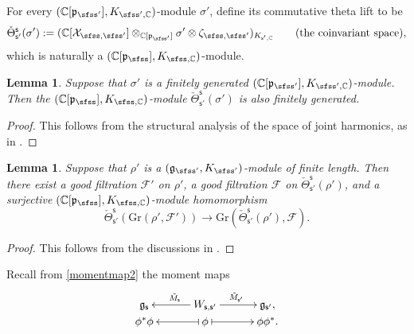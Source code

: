 \documentclass[11pt,a4paper]{amsart}
\newcommand{\CF}{{\mathcal {F}}}
\newcommand{\CX}{{\mathcal {X}}}
\newcommand{\g}{\mathfrak g}
\newcommand{\p}{\mathfrak p}
\numberwithin{equation}{section}
\newtheorem{lem}[thm]{Lemma}
\theoremstyle{remark}
\begin{document}
For every  $(\C[\p_{\sfss'}], K_{\sfss', \C})$-module $\sigma'$, define its commutative theta lift to be
\[
   \check \Theta_{\mathsf s'}^{\mathsf s}(\sigma'):=(\C[\CX_{\sfss, \sfss'}]\otimes_{\C[\p_{\sfss'}]} \sigma'\otimes \zeta_{\sfss, \sfss'})_{K_{\mathsf s', \C}} \qquad (\textrm{the  coinvariant space}),
\]
which is naturally a  $(\C[\p_{\sfss}], K_{\sfss, \C})$-module.

\begin{lem}
Suppose that $\sigma'$ is a finitely generated  $(\C[\p_{\sfss'}], K_{\sfss', \C})$-module. Then the  $(\C[\p_{\sfss}], K_{\sfss, \C})$-module   $\check \Theta_{\mathsf s'}^{\mathsf s}(\sigma')$ is also finitely generated.
\end{lem}
\begin{proof} This follows from the structural analysis of the space of joint harmonics, as in \cite[Section 4]{Howe89}.
\end{proof}

\begin{lem}\label{lm}
Suppose that $\rho'$ is a  $(\g_{\sfss'}, K_{\sfss'})$-module of finite length. Then there exist a good filtration $\CF'$ on $\rho'$, a good filtration $\CF$ on $\check \Theta_{\mathsf s'}^{\mathsf s}(\rho')$, and a surjective $(\C[\p_{\sfss}], K_{\sfss, \C})$-module homomorphism
\[
  \check \Theta_{\mathsf s'}^{\mathsf s}(\mathrm{Gr}(\rho',\CF')) \rightarrow \mathrm{Gr}(\check \Theta_{\mathsf s'}^{\mathsf s}(\rho'),\CF).
\]
\end{lem}
\begin{proof} This follows from the discussions in \cite[Section 3.2]{LM}.
\end{proof}


Recall from \eqref{momentmap2}  the moment maps
\[
    \xymatrix@R=0em@C=3em{
      \g_\mathsf s &\ar[l]_{\tilde M_\mathsf s} W_{\mathsf s, \mathsf s'}\ar[r]^{\tilde M_{\mathsf s'}}& \g_{\mathsf s'},\\
     \phi^* \phi & \ar@{|->}[l] \phi \ar@{|->}[r] & \phi \phi^*.
    }
  \]
\end{document}
